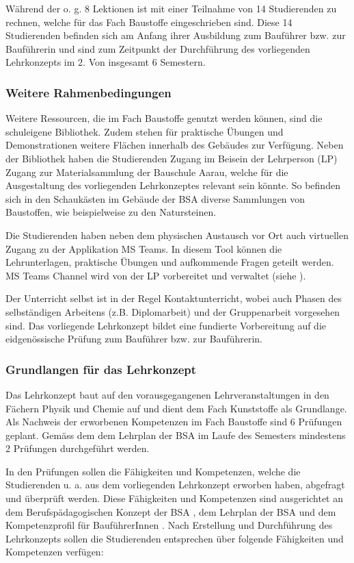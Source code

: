 \documentclass[
11pt,
captions=tableheading,
smallheadings,
headsepline,
footsepline, 
parskip=half-,
]{scrartcl}
\begin{document}
Während der o. g. 8 Lektionen ist mit einer Teilnahme von 14 Studierenden zu rechnen, welche für das Fach Baustoffe eingeschrieben sind. Diese 14 Studierenden befinden sich am Anfang ihrer Ausbildung zum Bauführer bzw. zur Bauführerin und sind zum Zeitpunkt der Durchführung des vorliegenden Lehrkonzepts im 2. Von insgesamt 6 Semestern. 

\subsubsection{Weitere Rahmenbedingungen}

Weitere Ressourcen, die im Fach Baustoffe genutzt werden können, sind die schuleigene Bibliothek. Zudem stehen für praktische Übungen und Demonstrationen weitere Flächen innerhalb des Gebäudes zur Verfügung. Neben der Bibliothek haben die Studierenden Zugang im Beisein der Lehrperson (LP) Zugang zur Materialsammlung der Bauschule Aarau, welche für die Ausgestaltung des vorliegenden Lehrkonzeptes relevant sein könnte. So befinden sich in den Schaukästen im Gebäude der BSA diverse Sammlungen von Baustoffen, wie beispielweise zu den Natursteinen.

Die Studierenden haben neben dem physischen Austausch vor Ort auch virtuellen Zugang zu der Applikation MS Teams. In diesem Tool können die Lehrunterlagen, praktische Übungen und aufkommende Fragen geteilt werden. MS Teams Channel wird von der LP vorbereitet und verwaltet (siehe ). 

Der Unterricht selbst ist in der Regel Kontaktunterricht, wobei auch Phasen des selbständigen Arbeitens (z.B. Diplomarbeit) und der Gruppenarbeit vorgesehen sind. Das vorliegende Lehrkonzept bildet eine fundierte Vorbereitung auf die eidgenössische Prüfung zum Bauführer bzw. zur Bauführerin.

\subsubsection{Grundlangen für das Lehrkonzept}

Das Lehrkonzept baut auf den vorausgegangenen Lehrveranstaltungen in den Fächern Physik und Chemie auf und dient dem Fach Kunststoffe als Grundlange.
Als Nachweis der erworbenen Kompetenzen im Fach Baustoffe sind 6 Prüfungen geplant. 
Gemäss dem  dem Lehrplan der BSA im Laufe des Semesters mindestens 2 Prüfungen durchgeführt werden.

In den Prüfungen sollen die Fähigkeiten und Kompetenzen, welche die Studierenden u. a. aus dem vorliegenden Lehrkonzept erworben haben, abgefragt und überprüft werden. Diese Fähigkeiten und Kompetenzen sind ausgerichtet an dem Berufspädagogischen Konzept der BSA \cite{BerufspädagogischesKonzept_BauschuleAarau}, dem Lehrplan der BSA und dem Kompetenzprofil für BauführerInnen \cite{Kompetenzprofil_Baufuehrer}. Nach Erstellung und Durchführung des Lehrkonzepts sollen die Studierenden entsprechen über folgende Fähigkeiten und Kompetenzen verfügen:
\end{document}
